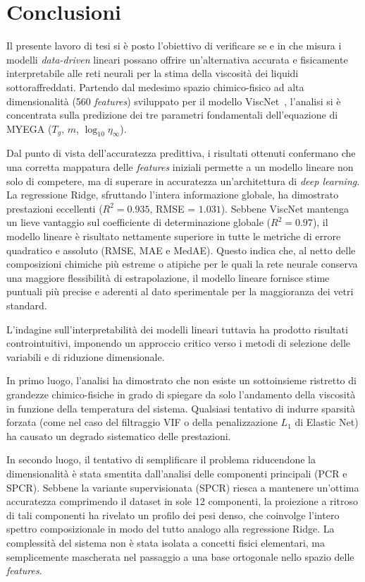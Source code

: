\documentclass[../main.tex]{subfiles}
\begin{document}
	
	\chapter{Conclusioni}
	\label{ch:conclusioni}
	
	Il presente lavoro di tesi si è posto l'obiettivo di verificare se e in che misura i modelli \textit{data-driven} lineari possano offrire un'alternativa accurata e fisicamente interpretabile alle reti neurali per la stima della viscosità dei liquidi sottoraffreddati. Partendo dal medesimo spazio chimico-fisico ad alta dimensionalità (560 \textit{features}) sviluppato per il modello ViscNet~\cite{cassarViscNetNeuralNetwork2021}, l'analisi si è concentrata sulla predizione dei tre parametri fondamentali dell'equazione di MYEGA ($T_g$, $m$, $\log_{10}\eta_\infty$).
	
	Dal punto di vista dell'accuratezza predittiva, i risultati ottenuti confermano che una corretta mappatura delle \textit{features} iniziali permette a un modello lineare non solo di competere, ma di superare in accuratezza un'architettura di \textit{deep learning}. La regressione Ridge, sfruttando l'intera informazione globale, ha dimostrato prestazioni eccellenti ($R^2 = 0.935$, RMSE = $1.031$). Sebbene ViscNet mantenga un lieve vantaggio sul coefficiente di determinazione globale ($R^2 = 0.97$), il modello lineare è risultato nettamente superiore in tutte le metriche di errore quadratico e assoluto (RMSE, MAE e MedAE). Questo indica che, al netto delle composizioni chimiche più estreme o atipiche per le quali la rete neurale conserva una maggiore flessibilità di estrapolazione, il modello lineare fornisce stime puntuali più precise e aderenti al dato sperimentale per la maggioranza dei vetri standard.
	
	L'indagine sull'interpretabilità dei modelli lineari tuttavia ha prodotto risultati controintuitivi, imponendo un approccio critico verso i metodi di selezione delle variabili e di riduzione dimensionale.
	
	In primo luogo, l'analisi ha dimostrato che non esiste un sottoinsieme ristretto di grandezze chimico-fisiche in grado di spiegare da solo l'andamento della viscosità in funzione della temperatura del sistema. Qualsiasi tentativo di indurre sparsità forzata (come nel caso del filtraggio VIF o della penalizzazione $L_1$ di Elastic Net) ha causato un degrado sistematico delle prestazioni. 
	
	In secondo luogo, il tentativo di semplificare il problema riducendone la dimensionalità è stata smentita dall'analisi delle componenti principali (PCR e SPCR). Sebbene la variante supervisionata (SPCR) riesca a mantenere un'ottima accuratezza comprimendo il dataset in sole 12 componenti, la proiezione a ritroso di tali componenti ha rivelato un profilo dei pesi denso, che coinvolge l'intero spettro composizionale in modo del tutto analogo alla regressione Ridge. La complessità del sistema non è stata isolata a concetti fisici elementari, ma semplicemente mascherata nel passaggio a una base ortogonale nello spazio delle \textit{features}.
	
\end{document}
